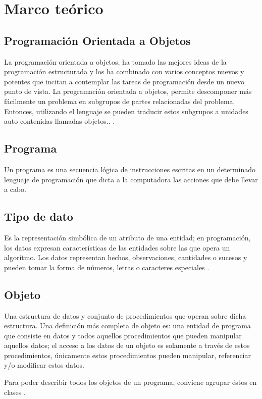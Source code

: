 \chapter{Marco teórico}

\section{Programación Orientada a Objetos}
La programación orientada a objetos, ha tomado las mejores ideas de la programación estructurada y los ha combinado con varios conceptos nuevos y potentes que incitan a contemplar las tareas de programación desde un nuevo punto de vista. La programación orientada a objetos, permite descomponer más fácilmente un problema en subgrupos de partes relacionadas del problema. Entonces, utilizando el lenguaje se pueden traducir estos subgrupos a unidades auto contenidas llamadas objetos.. \citep{izquierdo2007introduccion}.

\section{Programa}
Un programa es una secuencia lógica de instrucciones escritas en un determinado lenguaje de programación que dicta a la computadora las acciones que debe llevar a cabo.

\section{Tipo de dato}
Es la representación simbólica de un atributo de una entidad; en programación, los datos expresan características de las entidades sobre las que opera un algoritmo. Los datos representan hechos, observaciones, cantidades o sucesos y pueden tomar la forma de números, letras o caracteres especiales \citep{izquierdo2007introduccion}.

\section{Objeto}
Una estructura de datos y conjunto de procedimientos que operan sobre dicha estructura. Una definición más completa de objeto es: una entidad de programa que consiste en datos y todos aquellos procedimientos que pueden manipular aquellos datos; el acceso a los datos de un objeto es solamente a través de estos procedimientos, únicamente estos procedimientos pueden manipular, referenciar y/o modificar estos datos.

Para poder describir todos los objetos de un programa, conviene agrupar éstos en clases \citep{izquierdo2007introduccion}.

